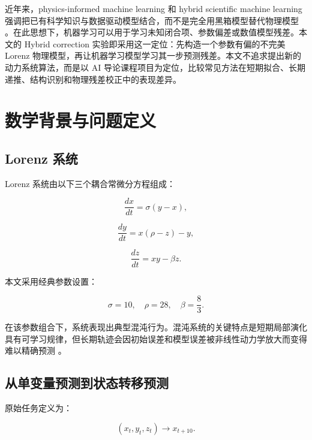 \documentclass[UTF8,a4paper,12pt]{ctexart}
\begin{document}
近年来，physics-informed machine learning 和 hybrid scientific machine learning 强调把已有科学知识与数据驱动模型结合，而不是完全用黑箱模型替代物理模型 \cite{raissi2019,karniadakis2021}。在此思想下，机器学习可以用于学习未知闭合项、参数偏差或数值模型残差。本文的 Hybrid correction 实验即采用这一定位：先构造一个参数有偏的不完美 Lorenz 物理模型，再让机器学习模型学习其一步预测残差。本文不追求提出新的动力系统算法，而是以 AI 导论课程项目为定位，比较常见方法在短期拟合、长期递推、结构识别和物理残差校正中的表现差异。

\section{数学背景与问题定义}

\subsection{Lorenz 系统}

Lorenz 系统由以下三个耦合常微分方程组成：

\begin{equation}
\frac{dx}{dt}=\sigma(y-x),
\end{equation}

\begin{equation}
\frac{dy}{dt}=x(\rho-z)-y,
\end{equation}

\begin{equation}
\frac{dz}{dt}=xy-\beta z.
\end{equation}

本文采用经典参数设置：

\begin{equation}
\sigma=10,\quad \rho=28,\quad \beta=\frac{8}{3}.
\end{equation}

在该参数组合下，系统表现出典型混沌行为。混沌系统的关键特点是短期局部演化具有可学习规律，但长期轨迹会因初始误差和模型误差被非线性动力学放大而变得难以精确预测 \cite{strogatz2015}。

\subsection{从单变量预测到状态转移预测}

原始任务定义为：

\begin{equation}
(x_t,y_t,z_t)\rightarrow x_{t+10}.
\end{equation}
\end{document}
